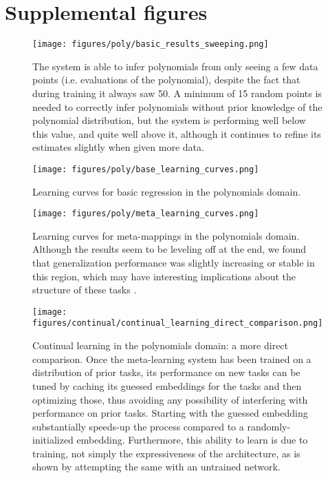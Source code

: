 \section{Supplemental figures} \label{app_supp_figures}
\begin{figure}[H]
\centering
\texttt{[image: figures/poly/basic\_results\_sweeping.png]}
\caption{The system is able to infer polynomials from only seeing a few data points (i.e. evaluations of the polynomial), despite the fact that during training it always saw 50. A minimum of 15 random points is needed to correctly infer polynomials without prior knowledge of the polynomial distribution, but the system is performing well below this value, and quite well above it, although it continues to refine its estimates slightly when given more data.}
\label{supp_poly_sweep_results}
\end{figure}

\begin{figure}[H]
\centering
\texttt{[image: figures/poly/base\_learning\_curves.png]}
\caption{Learning curves for basic regression in the polynomials domain.}
\label{supp_poly_basic_learning_curves}
\end{figure}

\begin{figure}[H]
\centering
\texttt{[image: figures/poly/meta\_learning\_curves.png]}
\caption{Learning curves for meta-mappings in the polynomials domain. Although the results seem to be leveling off at the end, we found that generalization performance was slightly increasing or stable in this region, which may have interesting implications about the structure of these tasks \citep{Lampinen2019}.}
\label{supp_poly_meta_learning_curves}
\end{figure}

\begin{figure}[H]
\centering
\texttt{[image: figures/continual/continual\_learning\_direct\_comparison.png]}
\caption{Continual learning in the polynomials domain: a more direct comparison. Once the meta-learning system has been trained on a distribution of prior tasks, its performance on new tasks can be tuned by caching its guessed embeddings for the tasks and then optimizing those, thus avoiding any possibility of interfering with performance on prior tasks. Starting with the guessed embedding substantially speeds-up the process compared to a randomly-initialized embedding. Furthermore, this ability to learn is due to training, not simply the expressiveness of the architecture, as is shown by attempting the same with an untrained network.}
\label{supp_poly_continual_results}
\end{figure}


